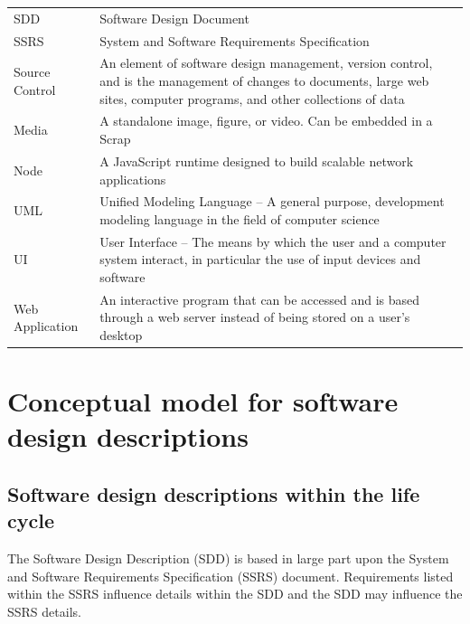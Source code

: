 \documentclass[onecolumn, draftclsnofoot,10pt, compsoc]{IEEEtran}
\begin{document}
\begin{center}
\begin{supertabular}{p{3cm}p{12cm}}
	SDD 
	& Software Design Document \\

	SSRS 
	& System and Software Requirements Specification \\

	Source Control 
	& An element of software design management, version control, and 
		is the management of changes to documents, large web sites, 
		computer programs, and other collections of data \\

	Media 
	& A standalone image, figure, or video. Can be embedded in a Scrap\\

	Node 
	& A JavaScript runtime designed to build scalable network applications\\

	UML 
	& Unified Modeling Language -- A general purpose, development 
	modeling language in the field of computer science\\

	UI  
	& User Interface -- The means by which the user and a 
	computer system interact, in particular the use of input 
	devices and software\\

	Web Application 
	& An interactive program that can be accessed and is based through 
	a web server instead of being stored on a user's desktop\\

\end{supertabular}

\end{center}



\section{Conceptual model for software design descriptions}



\subsection{Software design descriptions within the life cycle}
\noindent The Software Design Description (SDD) is based in large part upon
the System and Software Requirements Specification (SSRS) document.
Requirements listed within the SSRS influence details within the SDD and
the SDD may influence the SSRS details. \\
\end{document}

